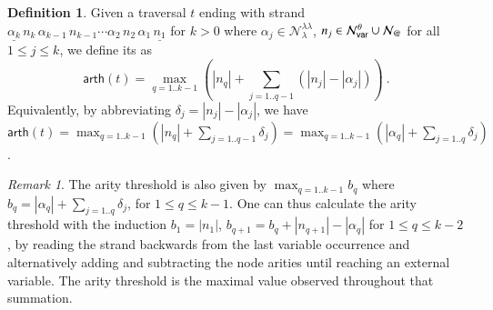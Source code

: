 \documentclass{elsarticle}
\makeatletter
\theoremstyle{plain}
\theoremstyle{definition}
\newtheorem{definition}{Definition}[section]
\theoremstyle{remark}
\newtheorem{remark}{Remark}[section]
\newcommand\Nodes{\mathcal{N}}%
\newcommand\NodesVar{\Nodes_{\sf var}}%
\newcommand\NodesLmd{\Nodes_\lambda}%
\newcommand\NodesApp{\Nodes_@}%
\newcommand{\ghostlmd}{{\lambda\!\!\lambda}}
\newcommand{\ghostvar}{\theta}
\newcommand\ImNodesVar{\NodesVar^\ghostvar}
\newcommand\ImNodesLmd{\NodesLmd^\ghostlmd}
\newcommand\arth{\textsf{arth}} %
\makeatother
\begin{document}
\begin{definition} %
\label{dfn:arity-threshold}
Given a traversal $t$ ending with strand
 $\underline{\alpha_k}\,n_k\,\alpha_{k-1}\,n_{k-1}\cdots \alpha_2\,n_2\, \alpha_1\,\underline{n_1}$ for $k>0$ where $\alpha_j \in \ImNodesLmd$, $n_j \in \ImNodesVar\union\NodesApp$ for all $1\leq j\leq k$,
we define its  as
$$
\arth(t) = \max_{q=1..k-1} \left( |n_q| + \sum_{j=1..q-1} (|n_j|-|\alpha_j|) \right)\ .
$$
Equivalently, by abbreviating $ \delta_j = |n_j|-|\alpha_j|$, we have
$\arth(t) = \max_{q=1..k-1} \left( |n_q| + \sum_{j=1..q-1} \delta_j \right)
= \max_{q=1..k-1} \left( |\alpha_q| + \sum_{j=1..q} \delta_j\right)
$.
\end{definition}


\begin{remark} %
The arity threshold is also given by
$\max_{q=1..k-1} b_q$
where $b_q = |\alpha_q| + \sum_{j=1..q} \delta_j$,
for $1\leq q\leq k-1$.
One can thus calculate the arity threshold with the induction
 $b_1 = |n_1|$, $b_{q+1} = b_q + |n_{q+1}|-|\alpha_q|$ for $1 \leq q \leq k-2$,
by reading the strand backwards from the last variable occurrence and alternatively adding and subtracting the node arities until reaching an external variable. The arity threshold is the maximal value observed throughout that summation.
\end{remark}
\end{document}
